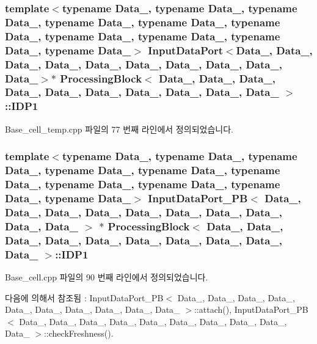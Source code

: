 \subsubsection[{\texorpdfstring{I\+D\+P1}{IDP1}}]{\setlength{\rightskip}{0pt plus 5cm}template$<$typename Data\+\_, typename Data\+\_, typename Data\+\_, typename Data\+\_, typename Data\+\_, typename Data\+\_, typename Data\+\_, typename Data\+\_, typename Data\+\_, typename Data\+\_$>$ {\bf Input\+Data\+Port}$<$Data\+\_, Data\+\_, Data\+\_, Data\+\_, Data\+\_, Data\+\_, Data\+\_, Data\+\_, Data\+\_, Data\+\_$>$$\ast$ {\bf Processing\+Block}$<$ Data\+\_, Data\+\_, Data\+\_, Data\+\_, Data\+\_, Data\+\_, Data\+\_, Data\+\_, Data\+\_, Data\+\_ $>$\+::I\+D\+P1}\hypertarget{classProcessingBlock_ad94bfed08d29895f22b8fcb80cabc0c0}{}\label{classProcessingBlock_ad94bfed08d29895f22b8fcb80cabc0c0}


Base\+\_\+cell\+\_\+temp.\+cpp 파일의 77 번째 라인에서 정의되었습니다.

\subsubsection[{\texorpdfstring{I\+D\+P1}{IDP1}}]{\setlength{\rightskip}{0pt plus 5cm}template$<$typename Data\+\_, typename Data\+\_, typename Data\+\_, typename Data\+\_, typename Data\+\_, typename Data\+\_, typename Data\+\_, typename Data\+\_, typename Data\+\_, typename Data\+\_$>$ {\bf Input\+Data\+Port\+\_\+\+PB}$<$ Data\+\_, Data\+\_, Data\+\_, Data\+\_, Data\+\_, Data\+\_, Data\+\_, Data\+\_, Data\+\_, Data\+\_ $>$ $\ast$ {\bf Processing\+Block}$<$ Data\+\_, Data\+\_, Data\+\_, Data\+\_, Data\+\_, Data\+\_, Data\+\_, Data\+\_, Data\+\_, Data\+\_ $>$\+::I\+D\+P1}\hypertarget{classProcessingBlock_ae8f4351f9dbe649144e8fde43a686b02}{}\label{classProcessingBlock_ae8f4351f9dbe649144e8fde43a686b02}


Base\+\_\+cell.\+cpp 파일의 90 번째 라인에서 정의되었습니다.



다음에 의해서 참조됨 \+:  Input\+Data\+Port\+\_\+\+P\+B$<$ Data\+\_, Data\+\_, Data\+\_, Data\+\_, Data\+\_, Data\+\_, Data\+\_, Data\+\_, Data\+\_, Data\+\_ $>$\+::attach(), Input\+Data\+Port\+\_\+\+P\+B$<$ Data\+\_, Data\+\_, Data\+\_, Data\+\_, Data\+\_, Data\+\_, Data\+\_, Data\+\_, Data\+\_, Data\+\_ $>$\+::check\+Freshness().

